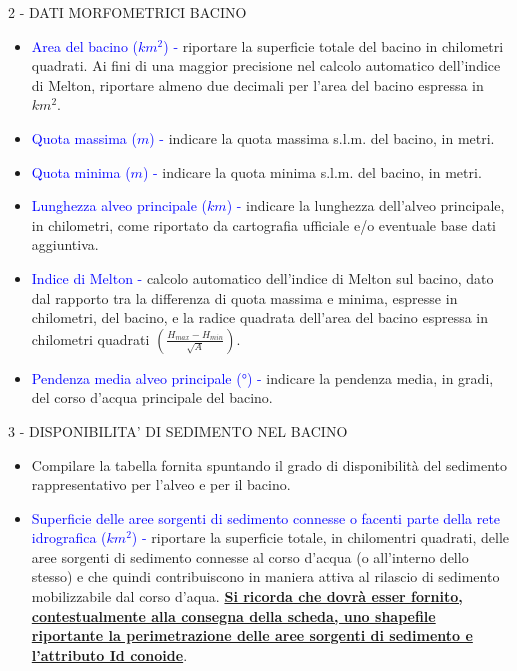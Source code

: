\documentclass[12pt,a4paper]{article}
\begin{document}
\begin{flushleft}
\vskip 5mm
2 - DATI MORFOMETRICI BACINO\\
\begin{itemize}
\item{\textcolor{blue}{Area del bacino ($km^2$) - }} riportare la superficie totale del bacino in chilometri quadrati. Ai fini di una maggior precisione nel calcolo automatico dell'indice di Melton, riportare almeno due decimali per l'area del bacino espressa in $km^2$.
\item{\textcolor{blue}{Quota massima ($m$) - }} indicare la quota massima s.l.m. del bacino, in metri.
\item{\textcolor{blue}{Quota minima ($m$) - }} indicare la quota minima s.l.m. del bacino, in metri.
\item{\textcolor{blue}{Lunghezza alveo principale ($km$) - }} indicare la lunghezza dell'alveo principale, in chilometri, come riportato da cartografia ufficiale e/o eventuale base dati aggiuntiva.
\item{\textcolor{blue}{Indice di Melton - }} calcolo automatico dell'indice di Melton sul bacino, dato dal rapporto tra la differenza di quota massima e minima, espresse in chilometri, del bacino, e la radice quadrata dell'area del bacino espressa in chilometri quadrati $(\frac{H_{max}-H_{min}}{\sqrt{A}})$.
\item{\textcolor{blue}{Pendenza media alveo principale ($°$) - }} indicare la pendenza media, in gradi, del corso d'acqua principale del bacino.
\end{itemize}


\vskip 5mm
3 - DISPONIBILITA' DI SEDIMENTO NEL BACINO\\
\begin{itemize}
\item Compilare la tabella fornita spuntando il grado di disponibilità del sedimento rappresentativo per l'alveo e per il bacino.
\item{\textcolor{blue}{Superficie delle aree sorgenti di sedimento connesse o facenti parte della rete idrografica ($km^2$) - }} riportare la superficie totale, in chilomentri quadrati, delle aree sorgenti di sedimento connesse al corso d'acqua (o all'interno dello stesso) e che quindi contribuiscono in maniera attiva al rilascio di sedimento mobilizzabile dal corso d'aqua.
\textbf{\uline{Si ricorda che dovrà esser fornito, contestualmente alla consegna della scheda, uno shapefile riportante la perimetrazione delle aree sorgenti di sedimento e l'attributo Id conoide}}.
\end{itemize}


\end{flushleft}
\end{document}
